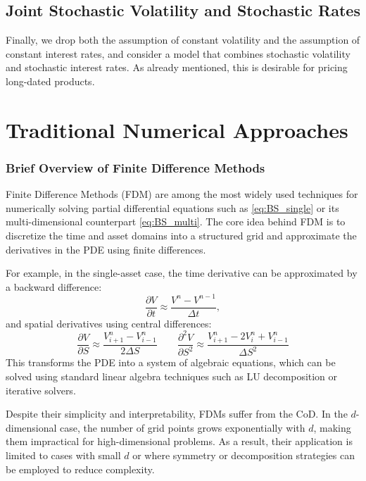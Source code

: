 \documentclass[12pt]{report} %
\theoremstyle{plain}           %
\theoremstyle{definition}      %
\theoremstyle{remark}          %
\begin{document}
\subsection{Joint Stochastic Volatility and Stochastic Rates}\label{sec:sv_rates}

Finally, we drop both the assumption of constant volatility and the
assumption of constant interest rates, and consider a model that combines
stochastic volatility and stochastic interest rates. As already mentioned, this is desirable for
pricing long-dated products.



\section{Traditional Numerical Approaches}

\subsubsection{Brief Overview of Finite Difference Methods}
Finite Difference Methods (FDM) are among the most widely used techniques for numerically 
solving partial differential equations such as \eqref{eq:BS_single} or its multi-dimensional 
counterpart \eqref{eq:BS_multi}. The core idea behind FDM is to discretize the time and 
asset domains into a structured grid and approximate the derivatives in the PDE using finite 
differences.

For example, in the single-asset case, the time derivative can be approximated by a backward 
difference:
\begin{equation}
	\frac{\partial V}{\partial t} \approx \frac{V^{n} - V^{n-1}}{\Delta t},
\end{equation}
and spatial derivatives using central differences:
\begin{equation}
	\frac{\partial V}{\partial S} \approx \frac{V_{i+1}^n - V_{i-1}^n}{2\Delta S}
	\qquad
	\frac{\partial^2 V}{\partial S^2} \approx \frac{V_{i+1}^n - 2V_i^n + V_{i-1}^n}{\Delta S^2}
\end{equation}
This transforms the PDE into a system of algebraic equations, which can be solved using 
standard linear algebra techniques such as LU decomposition or iterative solvers.

Despite their simplicity and interpretability, FDMs suffer from the 
CoD. In the $d$-dimensional case, the number of grid points grows 
exponentially with $d$, making them impractical for high-dimensional problems. As a result, 
their application is limited to cases with small $d$ or where symmetry or decomposition 
strategies can be employed to reduce complexity.
\end{document}
